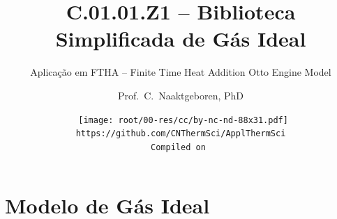 \makeatletter
\immediate{} %
\makeatother



\title{C.01.01.Z1 -- Biblioteca Simplificada de Gás Ideal}
\subtitle{Aplicação em FTHA -- Finite Time Heat Addition Otto Engine Model}
\author{Prof.~C.~Naaktgeboren, PhD}
\date{{\scriptsize\tt%
    \texttt{[image: root/00-res/cc/by-nc-nd-88x31.pdf]}\\[\smallskipamount]
    https://github.com/CNThermSci/ApplThermSci\\
    Compiled on 
}}

\logo{%
    \parbox{158mm}{%
        \texttt{[image: root/00-res/UTFPR/UTFPR-logo-D.pdf]}\hfill%
        \texttt{[image: root/00-res/logo/CNThermSci-logo-A.pdf]}%
}} %
\frame{\titlepage}

\section{Modelo de Gás Ideal}

